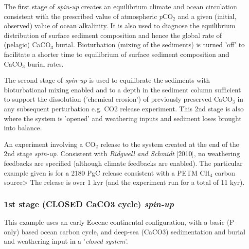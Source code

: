 \documentclass[10pt,twoside]{article}
\begin{document}
        \begin{compactenum}
        
                \item The first stage of \textit{spin-up} creates an equilibrium climate and ocean circulation consistent with the prescribed value of atmospheric \textit{p}CO$_{2}$ and a given (initial, observed) value of ocean alkalinity. It is also used to diagnose the equilibrium distribution of surface sediment composition and hence the global rate of (pelagic) CaCO$_{3}$ burial. Bioturbation (mixing of the sediments) is turned 'off' to facilitate a shorter time to equilibrium of surface sediment composition and CaCO$_{3}$ burial rates.
                
                \item The second stage of \textit{spin-up} is used to equilibrate the sediments with bioturbational mixing enabled and to a depth in the sediment column sufficient to support the dissolution ('chemical erosion') of previously preserved CaCO$_{3}$ in any subsequent perturbation e.g. CO2 release experiment. This 2nd stage is also where the system is 'opened' and weathering inputs and sediment loses brought into balance. 
                
                \item An experiment involving a CO$_{2}$ release to the system created at the end of the 2nd stage \textit{spin-up}. Consistent with \textit{Ridgwell and Schmidt} [2010], no weathering feedbacks are specified (although climate feedbacks are enabled). The particular example given is for a 2180 PgC release consistent with a PETM CH$_{4}$ carbon source> The release is over 1 kyr (and the experiment run for a total of 11 kyr).
                
        \end{compactenum}


\subsubsection{1st stage (CLOSED CaCO3 cycle) \textit{spin-up}}\label{EXAMPLE.p0055c.RidgwellSchmidt2010.SPIN1}

This example uses an early Eocene continental configuration, with a basic (P-only) based ocean carbon cycle, and deep-sea (CaCO3) sedimentation and burial and weathering input in a '\textit{closed system}'.
\end{document}
